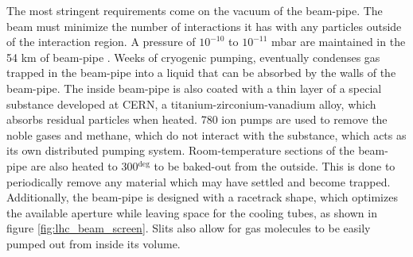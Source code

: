 \par The most stringent requirements come on the vacuum of the
beam-pipe.  The beam must minimize the number of interactions it has
with any particles outside of the interaction region.  A pressure of
$10^{-10}$ to $10^{-11}$ mbar are maintained in the 54 km of
beam-pipe \cite{LHC:LHC_lhc_vacuum_cernWebsite}.  Weeks of cryogenic
pumping, eventually condenses gas trapped in the beam-pipe into a
liquid that can be absorbed by the walls of the beam-pipe.  The inside
beam-pipe is also coated with a thin layer of a special substance 
developed at CERN, a titanium-zirconium-vanadium alloy, which absorbs
residual particles when heated.  780 ion pumps are used to remove the
noble gases and methane, which do not interact with the substance,
which acts as its own distributed pumping system.  Room-temperature
sections of the beam-pipe are also heated to 300$^{\deg}$ to be
baked-out from the outside.  This is done to periodically remove 
any material which may have settled and become trapped. Additionally,
the beam-pipe is designed with a racetrack shape, which optimizes the
available aperture while leaving space for the cooling tubes, as shown
in figure \ref{fig:lhc_beam_screen}.  Slits also allow for gas
molecules to be easily pumped out from inside its volume.   

